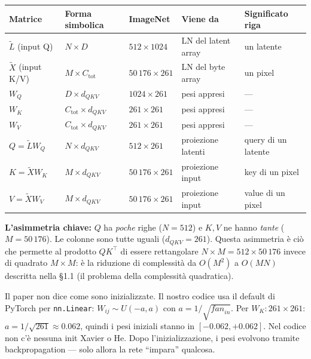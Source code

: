 \documentclass[
  11pt,
]{article}
\begin{document}
\begin{center}
\begin{tabular}{@{}lllll@{}}
\toprule
\textbf{Matrice} & \textbf{Forma simbolica} & \textbf{ImageNet} & \textbf{Viene da} & \textbf{Significato riga} \\
\midrule
$\tilde{L}$ (input Q) & $N \times D$ & $512 \times 1024$ & LN del latent array & un latente \\
$\tilde{X}$ (input K/V) & $M \times C_{\text{tot}}$ & $50\,176 \times 261$ & LN del byte array & un pixel \\
$W_Q$ & $D \times d_{QKV}$ & $1024 \times 261$ & pesi appresi & --- \\
$W_K$ & $C_{\text{tot}} \times d_{QKV}$ & $261 \times 261$ & pesi appresi & --- \\
$W_V$ & $C_{\text{tot}} \times d_{QKV}$ & $261 \times 261$ & pesi appresi & --- \\
\midrule
$Q = \tilde{L} W_Q$ & $N \times d_{QKV}$ & $512 \times 261$ & proiezione latenti & query di un latente \\
$K = \tilde{X} W_K$ & $M \times d_{QKV}$ & $50\,176 \times 261$ & proiezione input & key di un pixel \\
$V = \tilde{X} W_V$ & $M \times d_{QKV}$ & $50\,176 \times 261$ & proiezione input & value di un pixel \\
\bottomrule
\end{tabular}
\end{center}

\textbf{L'asimmetria chiave:} $Q$ ha \emph{poche} righe ($N = 512$) e $K, V$ ne hanno \emph{tante} ($M = 50\,176$). Le colonne sono tutte uguali ($d_{QKV} = 261$). Questa asimmetria è ciò che permette al prodotto $QK^\top$ di essere rettangolare $N \times M = 512 \times 50\,176$ invece di quadrato $M \times M$: è la riduzione di complessità da $O(M^2)$ a $O(MN)$ descritta nella §1.1 (il problema della complessità quadratica).

\begin{notabox}[title={\textbf{Inizializzazione di $W_Q$, $W_K$, $W_V$: default di PyTorch}}]
Il paper non dice come sono inizializzate. Il nostro codice usa il default di PyTorch per \texttt{nn.Linear}: $W_{ij} \sim U(-a, a)$ con $a = 1/\sqrt{\mathit{fan}_{in}}$. Per $W_K: 261 \times 261$: $a = 1/\sqrt{261} \approx 0.062$, quindi i pesi iniziali stanno in $[-0.062, +0.062]$. Nel codice non c'è nessuna init Xavier o He. Dopo l'inizializzazione, i pesi evolvono tramite backpropagation --- solo allora la rete ``impara'' qualcosa.
\end{notabox}
\end{document}
